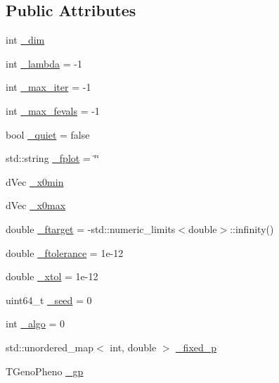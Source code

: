 \subsection*{Public Attributes}
\begin{DoxyCompactItemize}
\item 
int \hyperlink{classlibcmaes_1_1Parameters_affc62ae5c5f1db4f88e4c2dc96387af6}{\-\_\-dim}
\item 
int \hyperlink{classlibcmaes_1_1Parameters_af732f7206f23cbd6ec2bbd4e217a9a2b}{\-\_\-lambda} = -\/1
\item 
int \hyperlink{classlibcmaes_1_1Parameters_a60abfc730c5aa46e42ebd1598b59caa6}{\-\_\-max\-\_\-iter} = -\/1
\item 
int \hyperlink{classlibcmaes_1_1Parameters_ad316488121bd51f62b28e8183d591c9e}{\-\_\-max\-\_\-fevals} = -\/1
\item 
bool \hyperlink{classlibcmaes_1_1Parameters_a6f6dad55c02a23891e3280cad288295a}{\-\_\-quiet} = false
\item 
std\-::string \hyperlink{classlibcmaes_1_1Parameters_aa49511ea00199348ea94f1aa53fe5bc1}{\-\_\-fplot} = \char`\"{}\char`\"{}
\item 
d\-Vec \hyperlink{classlibcmaes_1_1Parameters_aa3bb27467698d9cb7fc7e0a83b48800f}{\-\_\-x0min}
\item 
d\-Vec \hyperlink{classlibcmaes_1_1Parameters_aece9694af9bee78bb13b0994db7ac45e}{\-\_\-x0max}
\item 
double \hyperlink{classlibcmaes_1_1Parameters_a837dbcfba351a043441076a11666f92c}{\-\_\-ftarget} = -\/std\-::numeric\-\_\-limits$<$double$>$\-::infinity()
\item 
double \hyperlink{classlibcmaes_1_1Parameters_ab6c11cc112b5709e9039967e881c808e}{\-\_\-ftolerance} = 1e-\/12
\item 
double \hyperlink{classlibcmaes_1_1Parameters_aaa9e8eedba7d7140d116163b40f653f8}{\-\_\-xtol} = 1e-\/12
\item 
uint64\-\_\-t \hyperlink{classlibcmaes_1_1Parameters_ac6d616c3d5295fec8a0b230592fb767a}{\-\_\-seed} = 0
\item 
int \hyperlink{classlibcmaes_1_1Parameters_a7a5fc681b0c7294ef050ace344f923db}{\-\_\-algo} = 0
\item 
std\-::unordered\-\_\-map$<$ int, double $>$ \hyperlink{classlibcmaes_1_1Parameters_a83fdae9d4bb9b77c8ad955c6aac75086}{\-\_\-fixed\-\_\-p}
\item 
T\-Geno\-Pheno \hyperlink{classlibcmaes_1_1Parameters_ab8e153b4785de9358599caa840b94ef2}{\-\_\-gp}
\end{DoxyCompactItemize}


